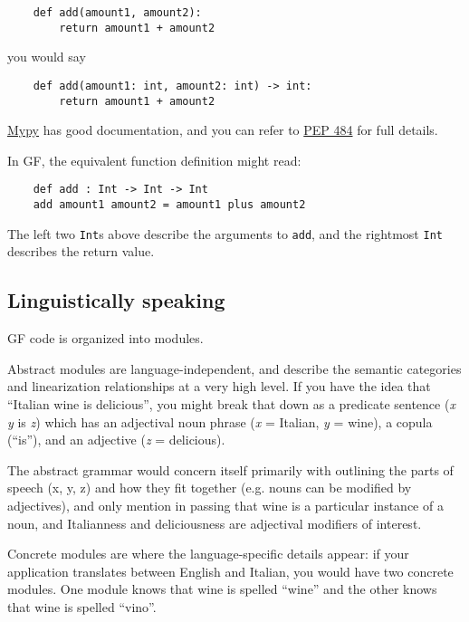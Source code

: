 \documentclass{scrartcl}
\begin{document}
\begin{verbatim}
    def add(amount1, amount2):
        return amount1 + amount2
\end{verbatim}

you would say

\begin{verbatim}
    def add(amount1: int, amount2: int) -> int:
        return amount1 + amount2
\end{verbatim}

\href{http://mypy-lang.org/}{Mypy} has good documentation, and you can refer to \href{https://www.python.org/dev/peps/pep-0484/}{PEP 484} for full details.

In GF, the equivalent function definition might read:

\begin{verbatim}
    def add : Int -> Int -> Int
    add amount1 amount2 = amount1 plus amount2
\end{verbatim}

The left two \texttt{Int}s above describe the arguments to \texttt{add}, and the rightmost \texttt{Int} describes the return value.

\subsection{Linguistically speaking}

GF code is organized into modules.

Abstract modules are language-independent, and describe the semantic categories and linearization relationships at a very high level. If you have the idea that ``Italian wine is delicious'', you might break that down as a predicate sentence (\emph{x} \emph{y} is \emph{z}) which has an adjectival noun phrase (\emph{x} = Italian, \emph{y} = wine), a copula (``is''), and an adjective (\emph{z} = delicious).

The abstract grammar would concern itself primarily with outlining the parts of speech (x, y, z) and how they fit together (e.g. nouns can be modified by adjectives), and only mention in passing that wine is a particular instance of a noun, and Italianness and deliciousness are adjectival modifiers of interest.

Concrete modules are where the language-specific details appear: if your application translates between English and Italian, you would have two concrete modules. One module knows that wine is spelled ``wine'' and the other knows that wine is spelled ``vino''.
\end{document}
